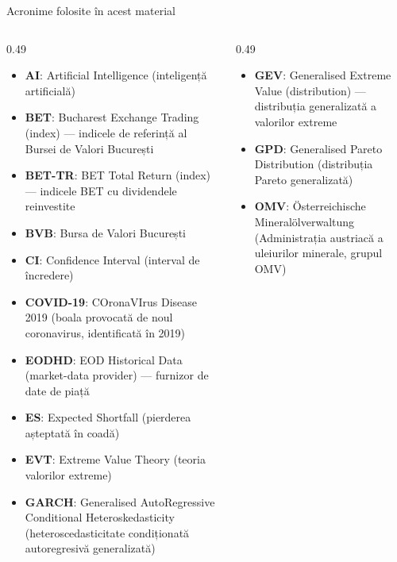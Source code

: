{
\begin{frame}[noframenumbering]
    \titlepage
\end{frame}
}
\begin{frame}{Acronime folosite în acest material}
\begin{columns}[T]
\begin{column}{0.49\textwidth}
\begin{itemize}\setlength{\itemsep}{0pt}
    \item \textbf{AI}: Artificial Intelligence (inteligență artificială)
    \item \textbf{BET}: Bucharest Exchange Trading (index) — indicele de referință al Bursei de Valori București
    \item \textbf{BET-TR}: BET Total Return (index) — indicele BET cu dividendele reinvestite
    \item \textbf{BVB}: Bursa de Valori București
    \item \textbf{CI}: Confidence Interval (interval de încredere)
    \item \textbf{COVID-19}: COronaVIrus Disease 2019 (boala provocată de noul coronavirus, identificată în 2019)
    \item \textbf{EODHD}: EOD Historical Data (market-data provider) — furnizor de date de piață
    \item \textbf{ES}: Expected Shortfall (pierderea așteptată în coadă)
    \item \textbf{EVT}: Extreme Value Theory (teoria valorilor extreme)
    \item \textbf{GARCH}: Generalised AutoRegressive Conditional Heteroskedasticity (heteroscedasticitate condiționată autoregresivă generalizată)
\end{itemize}
\end{column}
\begin{column}{0.49\textwidth}
\begin{itemize}\setlength{\itemsep}{0pt}
    \item \textbf{GEV}: Generalised Extreme Value (distribution) — distribuția generalizată a valorilor extreme
    \item \textbf{GPD}: Generalised Pareto Distribution (distribuția Pareto generalizată)
    \item \textbf{OMV}: Österreichische Mineralölverwaltung (Administrația austriacă a uleiurilor minerale, grupul OMV)

\end{itemize}
\end{column}
\end{columns}
\end{frame}
